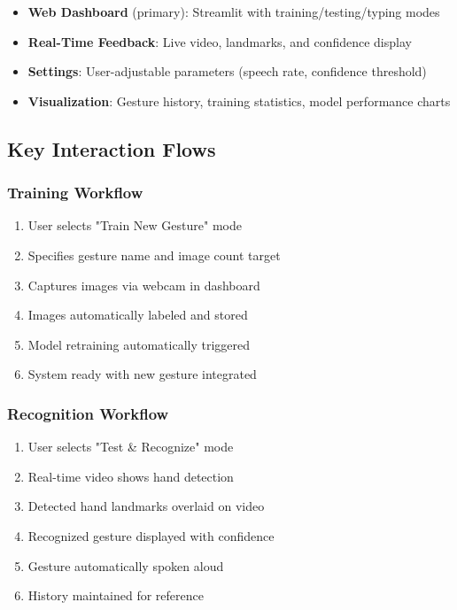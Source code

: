 \begin{itemize}
    \item \textbf{Web Dashboard} (primary): Streamlit with training/testing/typing modes
    \item \textbf{Real-Time Feedback}: Live video, landmarks, and confidence display
    \item \textbf{Settings}: User-adjustable parameters (speech rate, confidence threshold)
    \item \textbf{Visualization}: Gesture history, training statistics, model performance charts
\end{itemize}

\subsection{Key Interaction Flows}

\subsubsection{Training Workflow}
\begin{enumerate}
    \item User selects "Train New Gesture" mode
    \item Specifies gesture name and image count target
    \item Captures images via webcam in dashboard
    \item Images automatically labeled and stored
    \item Model retraining automatically triggered
    \item System ready with new gesture integrated
\end{enumerate}

\subsubsection{Recognition Workflow}
\begin{enumerate}
    \item User selects "Test & Recognize" mode
    \item Real-time video shows hand detection
    \item Detected hand landmarks overlaid on video
    \item Recognized gesture displayed with confidence
    \item Gesture automatically spoken aloud
    \item History maintained for reference
\end{enumerate}

